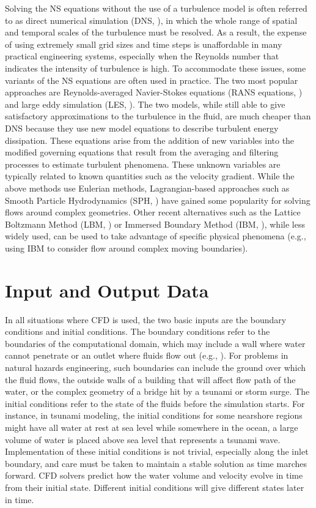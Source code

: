 Solving the NS equations without the use of a turbulence model is often referred to as direct numerical simulation (DNS,  \cite{Orszag1970DNS}), in which the whole range of spatial and temporal scales of the turbulence must be resolved. As a result, the expense of using extremely small grid sizes and time steps is unaffordable in many practical engineering systems, especially when the Reynolds number that indicates the intensity of turbulence is high. To accommodate these issues, some variants of the NS equations are often used in practice. The two most popular approaches are Reynolds-averaged Navier-Stokes equations (RANS equations, \cite{Reynolds1895RANS, Chou1945RANS}) and large eddy simulation (LES, \cite{Deardorff1970LES}). The two models, while still able to give satisfactory approximations to the turbulence in the fluid, are much cheaper than DNS because they use new model equations to describe turbulent energy dissipation. These equations arise from the addition of new variables into the modified governing equations that result from the averaging and filtering processes to estimate turbulent phenomena. These unknown variables are typically related to known quantities such as the velocity gradient.  
While the above methods use Eulerian methods, Lagrangian-based approaches such as Smooth Particle Hydrodynamics (SPH,  \cite{Gingold1977SPH, Lucy1977SPH, Lind2020SPH}) have gained some popularity  for solving flows around complex geometries.  Other recent alternatives such as the Lattice Boltzmann Method (LBM,  \cite{Chen1998LBM}) or Immersed Boundary Method (IBM,  \cite{Peskin1972IBM, Peskin1977IBM, Peskin2002IBM}), while less widely used, can be used to take advantage of specific physical phenomena (e.g., using IBM to consider flow around complex moving boundaries).  
 
\section{Input and Output Data}
\label{sec:resp_cfd_water_io}

In all situations where CFD is used, the two basic inputs are the boundary conditions and initial conditions. The boundary conditions refer to the boundaries of the computational domain, which may include a wall where water cannot penetrate or an outlet where fluids flow out (e.g., \cite{giles1990nonreflecting, }). For problems in natural hazards engineering, such boundaries can include the ground over which the fluid flows, the outside walls of a building that will affect flow path of the water, or the complex geometry of a bridge hit by a tsunami or storm surge. The initial conditions refer to the state of the fluids before the simulation starts. For instance, in tsunami modeling, the initial conditions for some nearshore regions might have all water at rest at sea level while somewhere in the ocean, a large volume of water is placed above sea level that represents a tsunami wave. Implementation of these initial conditions is not trivial, especially along the inlet boundary, and care must be taken to maintain a stable solution as time marches forward.  CFD solvers predict how the water volume and velocity evolve in time from their initial state. Different initial conditions will give different states later in time.

